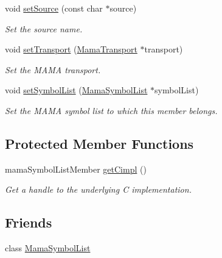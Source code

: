 \begin{DoxyCompactItemize}
void \hyperlink{classWombat_1_1MamaSymbolListMember_ade8e521c44ea064df4acf3868bcd0cb1}{setSource} (const char $\ast$source)
\begin{DoxyCompactList}\small\item\em Set the source name. \item\end{DoxyCompactList}\item 
void \hyperlink{classWombat_1_1MamaSymbolListMember_ab335a8f3a660d206c40fb2b5d561faa9}{setTransport} (\hyperlink{classWombat_1_1MamaTransport}{MamaTransport} $\ast$transport)
\begin{DoxyCompactList}\small\item\em Set the MAMA transport. \item\end{DoxyCompactList}\item 
void \hyperlink{classWombat_1_1MamaSymbolListMember_a9e3da0f70fcd48cfd9d0e2adae152234}{setSymbolList} (\hyperlink{classWombat_1_1MamaSymbolList}{MamaSymbolList} $\ast$symbolList)
\begin{DoxyCompactList}\small\item\em Set the MAMA symbol list to which this member belongs. \item\end{DoxyCompactList}\end{DoxyCompactItemize}
\subsection*{Protected Member Functions}
\begin{DoxyCompactItemize}
\item 
mamaSymbolListMember \hyperlink{classWombat_1_1MamaSymbolListMember_a4e125066d1f8b2d3f75a7928fa9966c5}{getCimpl} ()
\begin{DoxyCompactList}\small\item\em Get a handle to the underlying C implementation. \item\end{DoxyCompactList}\end{DoxyCompactItemize}
\subsection*{Friends}
\begin{DoxyCompactItemize}
\item 
class \hyperlink{classWombat_1_1MamaSymbolListMember_a8688dc35341e649acdc8b141807a9538}{MamaSymbolList}
\end{DoxyCompactItemize}



